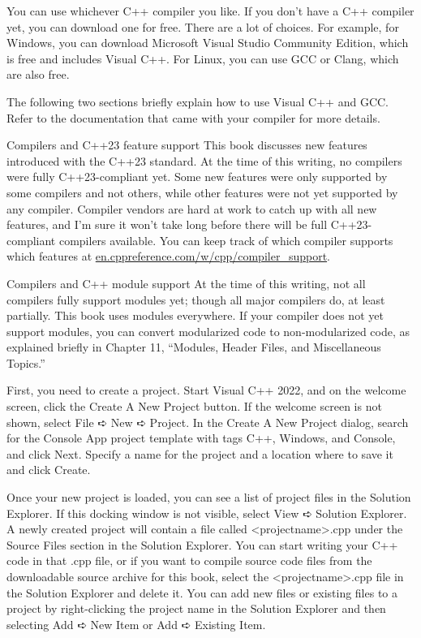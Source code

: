 
You can use whichever C++ compiler you like. If you don’t have a C++ compiler yet, you can download one for free. There are a lot of choices. For example, for Windows, you can download Microsoft Visual Studio Community Edition, which is free and includes Visual C++. For Linux, you can use GCC or Clang, which are also free.

The following two sections briefly explain how to use Visual C++ and GCC. Refer to the documentation that came with your compiler for more details.

\begin{myTip}{Compilers and C++23 feature support}
This book discusses new features introduced with the C++23 standard. At the time of this writing, no compilers were fully C++23-compliant yet. Some new features were only supported by some compilers and not others, while other features were not yet supported by any compiler. Compiler vendors are hard at work to catch up with all new features, and I’m sure it won’t take long before there will be full C++23-compliant compilers available. You can keep track of which compiler supports which features at \url{en.cppreference.com/w/cpp/compiler_support}.
\end{myTip}

\begin{myTip}{Compilers and C++ module support}
At the time of this writing, not all compilers fully support modules yet; though all major compilers do, at least partially. This book uses modules everywhere. If your compiler does not yet support modules, you can convert modularized code to non-modularized code, as explained briefly in Chapter 11, “Modules, Header Files, and Miscellaneous Topics.”
\end{myTip}


First, you need to create a project. Start Visual C++ 2022, and on the welcome screen, click the Create A New Project button. If the welcome screen is not shown, select File ➪ New ➪ Project. In the Create A New Project dialog, search for the Console App project template with tags C++, Windows, and Console, and click Next. Specify a name for the project and a location where to save it and click Create.

Once your new project is loaded, you can see a list of project files in the Solution Explorer. If this docking window is not visible, select View ➪ Solution Explorer. A newly created project will contain a file called <projectname>.cpp under the Source Files section in the Solution Explorer. You can start writing your C++ code in that .cpp file, or if you want to compile source code files from the downloadable source archive for this book, select the <projectname>.cpp file in the Solution Explorer and delete it. You can add new files or existing files to a project by right-clicking the project name in the Solution Explorer and then selecting Add ➪ New Item or Add ➪ Existing Item.

